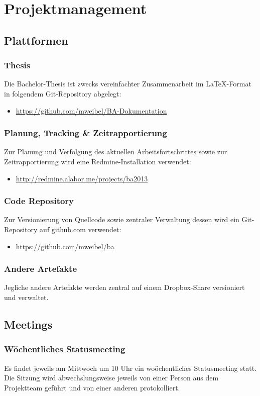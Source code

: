 \chapter{Projektmanagement}

\section{Plattformen}
\subsection{Thesis}
Die Bachelor-Thesis ist zwecks vereinfachter Zusammenarbeit im LaTeX-Format in folgendem Git-Repository abgelegt:
\begin{itemize}
	\item \url{https://github.com/mweibel/BA-Dokumentation}
\end{itemize}

\subsection{Planung, Tracking \& Zeitrapportierung}
Zur Planung und Verfolgung des aktuellen Arbeitsfortschrittes sowie zur Zeitrapportierung wird eine Redmine-Installation verwendet:
\begin{itemize}
	\item \url{http://redmine.alabor.me/projects/ba2013}
\end{itemize}

\subsection{Code Repository}
Zur Versionierung von Quellcode sowie zentraler Verwaltung dessen wird ein Git-Repository auf github.com verwendet:
\begin{itemize}
	\item \url{https://github.com/mweibel/ba}
\end{itemize}

\subsection{Andere Artefakte}
Jegliche andere Artefakte werden zentral auf einem Dropbox-Share versioniert und verwaltet.


\section{Meetings}
\subsection{Wöchentliches Statusmeeting}
Es findet jeweils am Mittwoch um 10 Uhr ein woöchentliches Statusmeeting statt. Die Sitzung wird abwechslungsweise jeweils von einer Person aus dem Projektteam geführt und von einer anderen protokolliert.

